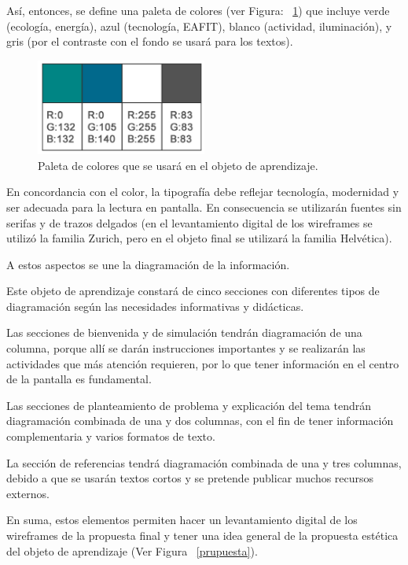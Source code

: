 \documentclass[twoside,letterpaper,12pt]{report}
\begin{document}
Así, entonces, se define una paleta de colores (ver Figura: ~\ref{paleta}) que incluye verde (ecología, energía), azul (tecnología, EAFIT), blanco (actividad, iluminación), y gris (por el contraste con el fondo se usará para los textos).
\begin{figure}[h!]
\label{paleta}
\centering
\includegraphics[width=0.5\textwidth]{aux/paletaColores}\caption{Paleta de colores que se usará en el objeto de aprendizaje.}
\end{figure}

En concordancia con el color, la tipografía debe reflejar tecnología, modernidad y ser adecuada para la lectura en pantalla. En consecuencia se utilizarán fuentes sin serifas y de trazos delgados (en el levantamiento digital de los wireframes se utilizó la familia Zurich, pero en el objeto final se utilizará la familia Helvética).

A estos aspectos se une la diagramación de la información.

Este objeto de aprendizaje constará de cinco secciones con diferentes tipos de diagramación según las necesidades informativas y didácticas.

Las secciones de bienvenida y de simulación tendrán diagramación de una columna, porque allí se darán instrucciones importantes y se realizarán las actividades que más atención requieren, por lo que tener información en el centro de la pantalla es fundamental.

Las secciones de planteamiento de problema y explicación del tema tendrán diagramación combinada de una y dos columnas, con el fin de tener información complementaria y varios formatos de texto.

La sección de referencias tendrá diagramación combinada de una y tres columnas, debido a que se usarán textos cortos y se pretende publicar muchos recursos externos.

En suma, estos elementos permiten hacer un levantamiento digital de los wireframes de la propuesta final y tener una idea general de la propuesta estética del objeto de aprendizaje (Ver Figura ~\ref{prupuesta}).
\end{document}
